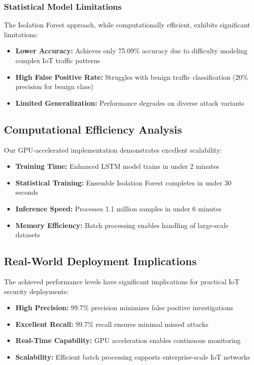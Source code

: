 \documentclass[conference]{IEEEtran}
\begin{document}
\subsubsection{Statistical Model Limitations}
The Isolation Forest approach, while computationally efficient, exhibits significant limitations:
\begin{itemize}
    \item \textbf{Lower Accuracy:} Achieves only 75.09\% accuracy due to difficulty modeling complex IoT traffic patterns
    \item \textbf{High False Positive Rate:} Struggles with benign traffic classification (20\% precision for benign class)
    \item \textbf{Limited Generalization:} Performance degrades on diverse attack variants
\end{itemize}

\subsection{Computational Efficiency Analysis}
Our GPU-accelerated implementation demonstrates excellent scalability:
\begin{itemize}
    \item \textbf{Training Time:} Enhanced LSTM model trains in under 2 minutes
    \item \textbf{Statistical Training:} Ensemble Isolation Forest completes in under 30 seconds
    \item \textbf{Inference Speed:} Processes 1.1 million samples in under 6 minutes
    \item \textbf{Memory Efficiency:} Batch processing enables handling of large-scale datasets
\end{itemize}

\subsection{Real-World Deployment Implications}
The achieved performance levels have significant implications for practical IoT security deployments:

\begin{itemize}
    \item \textbf{High Precision:} 99.7\% precision minimizes false positive investigations
    \item \textbf{Excellent Recall:} 99.7\% recall ensures minimal missed attacks
    \item \textbf{Real-Time Capability:} GPU acceleration enables continuous monitoring
    \item \textbf{Scalability:} Efficient batch processing supports enterprise-scale IoT networks
\end{itemize}
\end{document}
